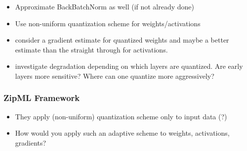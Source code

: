 \documentclass{article}
\begin{document}
\begin{itemize}
\begin{itemize}
            \item Approximate BackBatchNorm as well (if not already done)
            \item Use non-uniform quantization scheme for weights/activations
            \item consider a gradient estimate for quantized weights and maybe
            a better estimate than the straight through for activations.
            \item investigate degradation depending on which layers are quantized.
            Are early layers more sensitive? Where can one quantize more aggressively?
        \end{itemize}
    \end{itemize}


\subsubsection*{ZipML Framework}
\begin{itemize}
    \item They apply (non-uniform) quantization scheme only to input data (?)
    \item How would you apply such an adaptive scheme to weights, activations, gradients?
\end{itemize}
\end{document}
